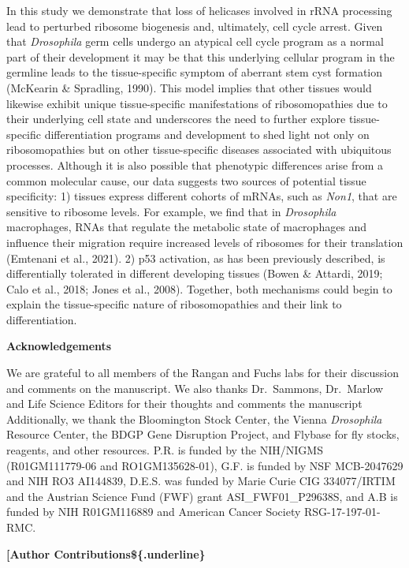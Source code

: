 \documentclass[12pt,oneside]{reedthesis}
\begin{document}
In this study we demonstrate that loss of helicases involved in rRNA
processing lead to perturbed ribosome biogenesis and, ultimately, cell
cycle arrest. Given that \emph{Drosophila} germ cells undergo an atypical
cell cycle program as a normal part of their development it may be that
this underlying cellular program in the germline leads to the
tissue-specific symptom of aberrant stem cyst formation
(McKearin \& Spradling, 1990). This model implies that other tissues would
likewise exhibit unique tissue-specific manifestations of
ribosomopathies due to their underlying cell state and underscores the
need to further explore tissue-specific differentiation programs and
development to shed light not only on ribosomopathies but on other
tissue-specific diseases associated with ubiquitous processes. Although
it is also possible that phenotypic differences arise from a common
molecular cause, our data suggests two sources of potential tissue
specificity: 1) tissues express different cohorts of mRNAs, such as
\emph{Non1}, that are sensitive to ribosome levels. For example, we find that
in \emph{Drosophila} macrophages, RNAs that regulate the metabolic state of
macrophages and influence their migration require increased levels of
ribosomes for their translation (Emtenani et al., 2021).
2) p53 activation, as has been previously described, is differentially
tolerated in different developing tissues
(Bowen \& Attardi, 2019; Calo et al., 2018; Jones et al., 2008). Together, both
mechanisms could begin to explain the tissue-specific nature of
ribosomopathies and their link to differentiation.

\textbf{{Acknowledgements}}

We are grateful to all members of the Rangan and Fuchs labs for their
discussion and comments on the manuscript. We also thanks Dr.~Sammons,
Dr.~Marlow and Life Science Editors for their thoughts and comments the
manuscript Additionally, we thank the Bloomington Stock Center, the
Vienna \emph{Drosophila} Resource Center, the BDGP Gene Disruption Project,
and Flybase for fly stocks, reagents, and other resources. P.R. is
funded by the NIH/NIGMS (R01GM111779-06 and RO1GM135628-01), G.F. is
funded by NSF MCB-2047629 and NIH RO3 AI144839, D.E.S. was funded by
Marie Curie CIG 334077/IRTIM and the Austrian Science Fund (FWF) grant
ASI\_FWF01\_P29638S, and A.B is funded by NIH R01GM116889 and American
Cancer Society RSG-17-197-01-RMC.

\textbf{{[}Author Contributions\$\{.underline\}}
\end{document}

